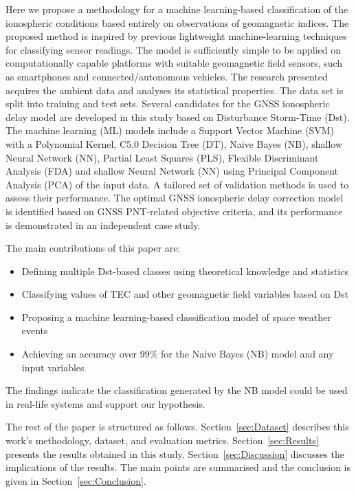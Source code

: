 \documentclass[sn-mathphys-num]{sn-jnl}%
\begin{document}
Here we propose a methodology for a machine learning-based classification of the ionospheric conditions based entirely on observations of geomagnetic indices. The proposed method is inspired by previous lightweight machine-learning techniques \cite{filjar2020comparison} for classifying sensor readings. The model is sufficiently simple to be applied on computationally capable platforms with suitable geomagnetic field sensors, such as smartphones and connected/autonomous vehicles. The research presented acquires the ambient data and analyses its statistical properties. The data set is split into training and test sets. Several candidates for the GNSS ionospheric delay model are developed in this study based on Disturbance Storm-Time (Dst). The machine learning (ML) models include a Support Vector Machine (SVM) with a Polynomial Kernel, C5.0 Decision Tree (DT), Naive Bayes (NB), shallow Neural Network (NN), Partial Least Squares (PLS), Flexible Discriminant Analysis (FDA) and shallow Neural Network (NN) using Principal Component Analysis (PCA) of the input data. A tailored set of validation methods is used to assess their performance. The optimal GNSS ionospheric delay correction model is identified based on GNSS PNT-related objective criteria, and its performance is demonstrated in an independent case study.

The main contributions of this paper are:

\begin{itemize}
    \item Defining multiple Dst-based classes using theoretical knowledge and statistics
    \item Classifying values of TEC and other geomagnetic field variables based on Dst
    \item Proposing a machine learning-based classification model of space weather events
    \item Achieving an accuracy over $99\%$ for the Naive Bayes (NB) model and any input variables
\end{itemize}

The findings indicate the classification generated by the NB model could be used in real-life systems and support our hypothesis.

The rest of the paper is structured as follows. Section~\ref{sec:Dataset} describes this work's methodology, dataset, and evaluation metrics. Section~\ref{sec:Results} presents the results obtained in this study. Section~\ref{sec:Discussion} discusses the implications of the results. The main points are summarised and the conclusion is given in Section~\ref{sec:Conclusion}.
\end{document}
